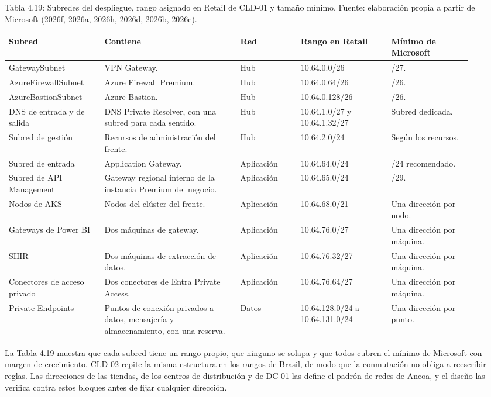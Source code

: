\documentclass[11pt]{article}
\begin{document}
Tabla 4.19: Subredes del despliegue, rango asignado en Retail de CLD-01 y tamaño mínimo. Fuente: elaboración propia a partir de Microsoft (2026f, 2026a, 2026h, 2026d, 2026b, 2026e).\par\nopagebreak
\begin{longtable}{@{}p{0.19\linewidth}p{0.27\linewidth}p{0.12\linewidth}p{0.18\linewidth}p{0.16\linewidth}@{}}
\toprule Subred & Contiene & Red & Rango en Retail & Mínimo de Microsoft \\
\midrule\endhead\bottomrule\endlastfoot
GatewaySubnet & VPN Gateway. & Hub & 10.64.0.0/26 & /27. \\
AzureFirewallSubnet & Azure Firewall Premium. & Hub & 10.64.0.64/26 & /26. \\
AzureBastionSubnet & Azure Bastion. & Hub & 10.64.0.128/26 & /26. \\
DNS de entrada y de salida & DNS Private Resolver, con una subred para cada sentido. & Hub & 10.64.1.0/27 y 10.64.1.32/27 & Subred dedicada. \\
Subred de gestión & Recursos de administración del frente. & Hub & 10.64.2.0/24 & Según los recursos. \\
Subred de entrada & Application Gateway. & Aplicación & 10.64.64.0/24 & /24 recomendado. \\
Subred de API Management & Gateway regional interno de la instancia Premium del negocio. & Aplicación & 10.64.65.0/24 & /29. \\
Nodos de AKS & Nodos del clúster del frente. & Aplicación & 10.64.68.0/21 & Una dirección por nodo. \\
Gateways de Power BI & Dos máquinas de gateway. & Aplicación & 10.64.76.0/27 & Una dirección por máquina. \\
SHIR & Dos máquinas de extracción de datos. & Aplicación & 10.64.76.32/27 & Una dirección por máquina. \\
Conectores de acceso privado & Dos conectores de Entra Private Access. & Aplicación & 10.64.76.64/27 & Una dirección por máquina. \\
Private Endpoints & Puntos de conexión privados a datos, mensajería y almacenamiento, con una reserva. & Datos & 10.64.128.0/24 a 10.64.131.0/24 & Una dirección por punto. \\
\end{longtable}

La Tabla 4.19 muestra que cada subred tiene un rango propio, que ninguno se solapa y que todos cubren el mínimo de Microsoft con margen de crecimiento. CLD-02 repite la misma estructura en los rangos de Brasil, de modo que la conmutación no obliga a reescribir reglas. Las direcciones de las tiendas, de los centros de distribución y de DC-01 las define el padrón de redes de Ancoa, y el diseño las verifica contra estos bloques antes de fijar cualquier dirección.
\end{document}
